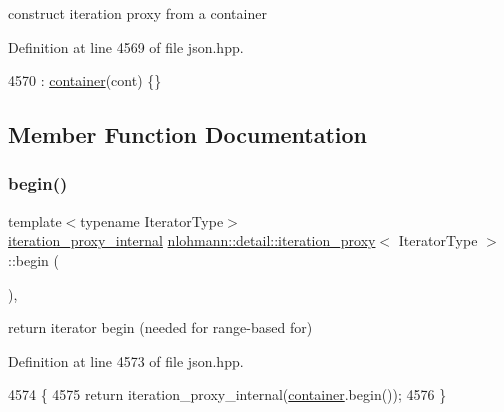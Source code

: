 construct iteration proxy from a container 



Definition at line 4569 of file json.\+hpp.


\begin{DoxyCode}
4570         : \hyperlink{classnlohmann_1_1detail_1_1iteration__proxy_a88c0532ba4a5de1d527b18053b24fd19}{container}(cont) \{\}
\end{DoxyCode}


\subsection{Member Function Documentation}
\mbox{\label{classnlohmann_1_1detail_1_1iteration__proxy_a43612db469c82118fc648c3729e40cee}} 
\subsubsection{\texorpdfstring{begin()}{begin()}}
{\footnotesize\ttfamily template$<$typename Iterator\+Type$>$ \\
\hyperlink{classnlohmann_1_1detail_1_1iteration__proxy_1_1iteration__proxy__internal}{iteration\+\_\+proxy\+\_\+internal} \hyperlink{classnlohmann_1_1detail_1_1iteration__proxy}{nlohmann\+::detail\+::iteration\+\_\+proxy}$<$ Iterator\+Type $>$\+::begin (\begin{DoxyParamCaption}{ }\end{DoxyParamCaption})\hspace{0.3cm}{\ttfamily [inline]}, {\ttfamily [noexcept]}}



return iterator begin (needed for range-\/based for) 



Definition at line 4573 of file json.\+hpp.


\begin{DoxyCode}
4574     \{
4575         \textcolor{keywordflow}{return} iteration\_proxy\_internal(\hyperlink{classnlohmann_1_1detail_1_1iteration__proxy_a88c0532ba4a5de1d527b18053b24fd19}{container}.begin());
4576     \}
\end{DoxyCode}
\mbox{\label{classnlohmann_1_1detail_1_1iteration__proxy_a41303419d073f32fcf1956978410d816}} 
